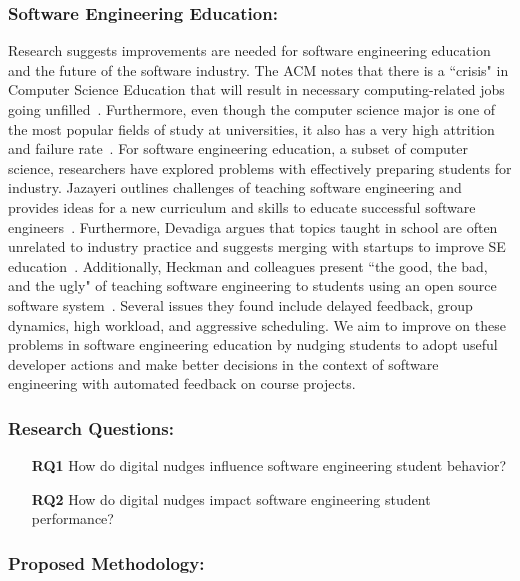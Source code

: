 \subsubsection{Software Engineering Education:} Research suggests improvements are needed for software engineering education and the future of the software industry. The ACM notes that there is a ``crisis" in Computer Science Education that will result in necessary computing-related jobs going unfilled~\cite{emptyfailure}. Furthermore, even though the computer science major is one of the most popular fields of study at universities, it also has a very high attrition and failure rate~\cite{beaubouef2005high}. For software engineering education, a subset of computer science, researchers have explored problems with effectively preparing students for industry. Jazayeri outlines challenges of teaching software engineering and provides ideas for a new curriculum and skills to educate successful software engineers~\cite{jazayeri2004education}. Furthermore, Devadiga argues that topics taught in school are often unrelated to industry practice and suggests merging with startups to improve SE education~\cite{devadiga2017software}. Additionally, Heckman and colleagues present ``the good, the bad, and the ugly" of teaching software engineering to students using an open source software system~\cite{Heckman2018Itrust}. Several issues they found include delayed feedback, group dynamics, high workload, and aggressive scheduling. We aim to improve on these problems in software engineering education by nudging students to adopt useful developer actions and make better decisions in the context of software engineering with automated feedback on course projects.

\subsubsection{Research Questions:}

\begin{itemize}
    \item[\textbf{RQ1}] How do digital nudges influence software engineering student behavior?
    \item[\textbf{RQ2}] How do digital nudges impact software engineering student performance?
\end{itemize}

\subsubsection{Proposed Methodology:}

